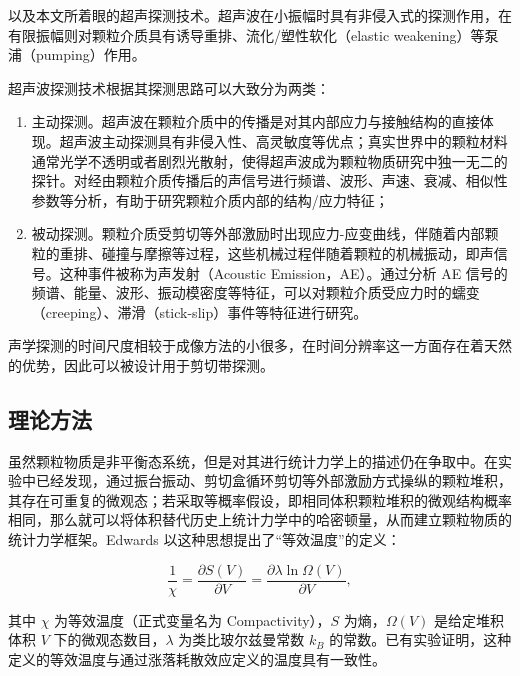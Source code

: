 以及本文所着眼的超声探测技术。超声波在小振幅时具有非侵入式的探测作用，在有限振幅则对颗粒介质具有诱导重排\cite{PhysRevE.84.020301}、流化/塑性软化（elastic weakening）\cite{PhysRevE.84.020301}等泵浦（pumping）作用。

超声波探测技术根据其探测思路可以大致分为两类：

\begin{enumerate}
  \item 主动探测。超声波在颗粒介质中的传播是对其内部应力与接触结构的直接体现\cite{PhysRevB.48.15646,Jia1999UltrasoundPI,Transitional}。超声波主动探测具有非侵入性、高灵敏度等优点；真实世界中的颗粒材料通常光学不透明或者剧烈光散射，使得超声波成为颗粒物质研究中独一无二的探针。对经由颗粒介质传播后的声信号进行频谱、波形、声速、衰减、相似性参数等分析，有助于研究颗粒介质内部的结构/应力特征；
  \item 被动探测。颗粒介质受剪切等外部激励时出现应力-应变曲线，伴随着内部颗粒的重排、碰撞与摩擦等过程，这些机械过程伴随着颗粒的机械振动，即声信号。这种事件被称为声发射（Acoustic Emission，AE）。通过分析 AE 信号的频谱、能量、波形、振动模密度等特征\cite{PhysRevLett.120.218003,10.1029/2023JB026612,doi:10.1073/pnas.2305134120}，可以对颗粒介质受应力时的蠕变（creeping）、滞滑（stick-slip）事件等特征进行研究。
\end{enumerate}

声学探测的时间尺度相较于成像方法的小很多，在时间分辨率这一方面存在着天然的优势，因此可以被设计用于剪切带探测\cite{PhysRevE.85.051302}。


\subsection{理论方法}

虽然颗粒物质是非平衡态系统，但是对其进行统计力学上的描述仍在争取中。在实验中已经发现，通过振台振动、剪切盒循环剪切等外部激励方式操纵的颗粒堆积，其存在可重复的微观态；若采取等概率假设，即相同体积颗粒堆积的微观结构概率相同，那么就可以将体积替代历史上统计力学中的哈密顿量，从而建立颗粒物质的统计力学框架。Edwards 以这种思想提出了“等效温度”的定义：


\begin{equation}
  \frac{1}{\chi} = \frac{\partial S(V)}{\partial V} = \frac{\partial \lambda\ln{\Omega(V)}}{\partial V},
\end{equation}

其中 $\chi$ 为等效温度（正式变量名为 Compactivity），$S$ 为熵，$\Omega(V)$ 是给定堆积体积 $V$ 下的微观态数目，$\lambda$ 为类比玻尔兹曼常数 $k_{B}$ 的常数。已有实验证明，这种定义的等效温度与通过涨落耗散效应定义的温度具有一致性\cite{PhysRevLett.129.228004}。

